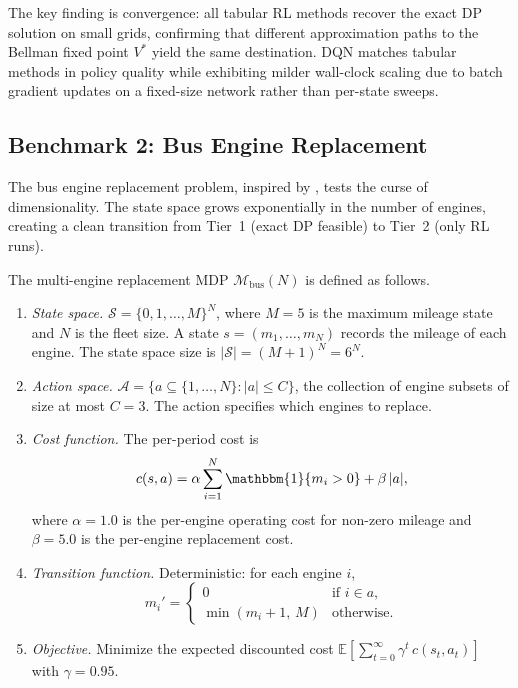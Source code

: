 

The key finding is convergence: all tabular RL methods recover the exact DP solution on small grids, confirming that different approximation paths to the Bellman fixed point $V^*$ yield the same destination. DQN matches tabular methods in policy quality while exhibiting milder wall-clock scaling due to batch gradient updates on a fixed-size network rather than per-state sweeps.


\subsection{Benchmark 2: Bus Engine Replacement}
\label{sec:benchmark_bus}

The bus engine replacement problem, inspired by \citet{Rust1987}, tests the curse of dimensionality. The state space grows exponentially in the number of engines, creating a clean transition from Tier~1 (exact DP feasible) to Tier~2 (only RL runs).

\begin{definition}
\label{def:bus_engine_mdp}
The multi-engine replacement MDP $\mathcal{M}_{\mathrm{bus}}(N)$ is defined as follows.
\begin{enumerate}
    \item \emph{State space.} $\mathcal{S} = \{0, 1, \ldots, M\}^N$, where $M = 5$ is the maximum mileage state and $N$ is the fleet size. A state $s = (m_1, \ldots, m_N)$ records the mileage of each engine. The state space size is $|\mathcal{S}| = (M+1)^N = 6^N$.
    \item \emph{Action space.} $\mathcal{A} = \{a \subseteq \{1, \ldots, N\} : |a| \leq C\}$, the collection of engine subsets of size at most $C = 3$. The action specifies which engines to replace.
    \item \emph{Cost function.} The per-period cost is
    \begin{equation}
    \label{eq:bus_cost}
    c(s, a) = \alpha \sum_{i=1}^{N} \mathbbm{1}\{m_i > 0\} + \beta \, |a|,
    \end{equation}
    where $\alpha = 1.0$ is the per-engine operating cost for non-zero mileage and $\beta = 5.0$ is the per-engine replacement cost.
    \item \emph{Transition function.} Deterministic: for each engine $i$,
    \begin{equation}
    \label{eq:bus_transition}
    m_i' = \begin{cases} 0 & \text{if } i \in a, \\ \min(m_i + 1,\, M) & \text{otherwise.} \end{cases}
    \end{equation}
    \item \emph{Objective.} Minimize the expected discounted cost $\mathbb{E}\left[\sum_{t=0}^{\infty} \gamma^t \, c(s_t, a_t)\right]$ with $\gamma = 0.95$.
\end{enumerate}
\end{definition}

